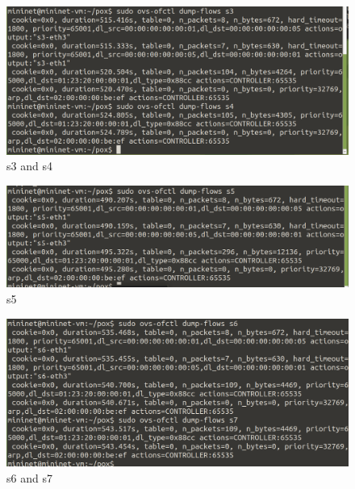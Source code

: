 \documentclass{article}[12pt]
\begin{document}
\begin{enumerate}
    \begin{figure}[!h]
        \centering
        \includegraphics[width=\textwidth,height=\textheight,keepaspectratio]{s3s4.png}
        \caption{s3 and s4}
    \end{figure}

    \begin{figure}[!h]
        \centering
        \includegraphics[width=\textwidth,height=\textheight,keepaspectratio]{s5.png}
        \caption{s5}
    \end{figure}

    \begin{figure}[!h]
        \centering
        \includegraphics[width=\textwidth,height=\textheight,keepaspectratio]{s6s7.png}
        \caption{s6 and s7}
    \end{figure}
    
\end{enumerate}
\end{document}
